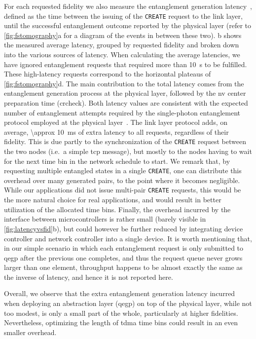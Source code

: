 For each requested fidelity we also measure the entanglement generation
latency~\cite{dahlberg_2019_egp}, defined as the time between the issuing of the \texttt{CREATE}
request to the link layer, until the successful entanglement outcome reported by the physical layer
(refer to \cref{fig:fstomography}a for a diagram of the events in between these two).
b shows the measured average latency, grouped by requested fidelity and
broken down into the various sources of latency. When calculating the average latencies, we have
ignored entanglement requests that required more than \qty{10}{s} to be fulfilled. These
high-latency requests correspond to the horizontal plateaus of \cref{fig:fstomography}d. The main
contribution to the total latency comes from the entanglement generation process at the physical
layer, followed by the \acrshort{nv} center preparation time (\acrshort{crcheck}). Both latency
values are consistent with the expected number of entanglement attempts required by the
single-photon entanglement protocol employed at the physical layer~\cite{humphreys_2018_delivery}.
The link layer protocol adds, on average, \qty{\approx 10}{\ms} of extra latency to all requests,
regardless of their fidelity. This is due partly to the synchronization of the \texttt{CREATE}
request between the two nodes (i.e.~a simple \acrshort{tcp} message), but mostly to the nodes having
to wait for the next time bin in the network schedule to start. We remark that, by requesting
multiple entangled states in a single \texttt{CREATE}, one can distribute this overhead over many
generated pairs, to the point where it becomes negligible. While our applications did not issue
multi-pair \texttt{CREATE} requests, this would be the more natural choice for real applications,
and would result in better utilization of the allocated time bins. Finally, the overhead incurred by
the interface between microcontrollers is rather small (barely visible in \cref{fig:latencyvsfid}b),
but could however be further reduced by integrating device controller and network controller into a
single device. It is worth mentioning that, in our simple scenario in which each entanglement
request is only submitted to \acrshort{qegp} after the previous one completes, and thus the request
queue never grows larger than one element, throughput happens to be almost exactly the same as the
inverse of latency, and hence it is not reported here.

Overall, we observe that the extra entanglement generation latency incurred when deploying an
abstraction layer (\acrshort{qegp}) on top of the physical layer, while not too modest, is only a
small part of the whole, particularly at higher fidelities. Nevertheless, optimizing the length of
\acrshort{tdma} time bins could result in an even smaller overhead.

